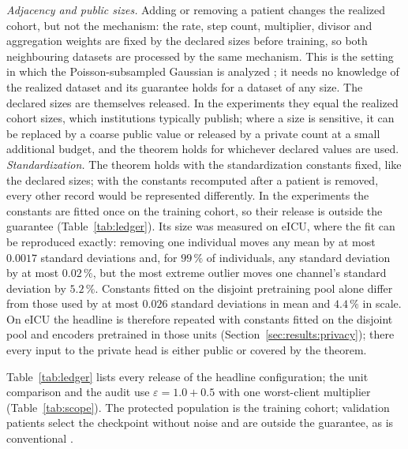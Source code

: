\emph{Adjacency and public sizes.} Adding or removing a patient changes the
realized cohort, but not the mechanism: the rate, step count, multiplier,
divisor and aggregation weights are fixed by the declared sizes before
training, so both neighbouring datasets are processed by the same mechanism.
This is the setting in which the Poisson-subsampled Gaussian is analyzed
\cite{ref29, ref33}; it needs no knowledge of the realized dataset and its
guarantee holds for a dataset of any size. The declared sizes are themselves
released. In the experiments they equal the realized cohort sizes, which
institutions typically publish; where a size is sensitive, it can be replaced
by a coarse public value or released by a private count at a small additional
budget, and the theorem holds for whichever declared values are used. \emph{Standardization.} The theorem holds with the standardization
constants fixed, like the declared sizes; with the constants recomputed after
a patient is removed, every other record would be represented differently.
In the experiments the constants are fitted once on the training cohort, so
their release is outside the guarantee (Table~\ref{tab:ledger}). Its size was
measured on eICU, where the fit can be reproduced exactly: removing one
individual moves any mean by at most $0.0017$ standard deviations and, for
$99\,\%$ of individuals, any standard deviation by at most $0.02\,\%$, but
the most extreme outlier moves one channel's standard deviation by
$5.2\,\%$. Constants fitted on the disjoint pretraining pool alone differ
from those used by at most $0.026$ standard deviations in mean and
$4.4\,\%$ in scale. On eICU the headline is therefore repeated with
constants fitted on the disjoint pool and encoders pretrained in those units
(Section~\ref{sec:results:privacy}); there every input to the private head is
either public or covered by the theorem.

Table~\ref{tab:ledger} lists every release of the headline configuration;
the unit comparison and the audit use $\varepsilon = 1.0 + 0.5$ with one
worst-client multiplier (Table~\ref{tab:scope}). The protected population is
the training cohort; validation patients select the checkpoint without noise
and are outside the guarantee, as is conventional \cite{ref6}.

